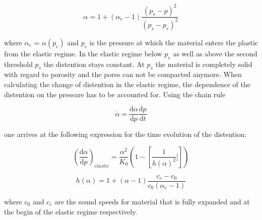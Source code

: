 \begin{equation}
    \alpha = 1 + \left(\alpha_e - 1 \right) \frac{\left(p_s - p\right)^2}{\left(p_s - p_e\right)^2}
\end{equation}

where $\alpha_e$ = $\alpha\left(p_e\right)$ and $p_e$ is the pressure at which the material enters the plastic from the elastic regime. In the elastic regime below $p_e$ as well as above the second threshold $p_s$ the distention stays constant. At $p_s$ the material is completely solid with regard to porosity and the pores can not be compacted anymore. When calculating the change of distention in the elastic regime, the dependence of the distention on the pressure has to be accounted for. Using the chain rule

\begin{equation}
    \dot{\alpha} = \frac{\mathrm{d}\alpha}{\mathrm{d}p}\frac{\mathrm{d}p}{\mathrm{d}t}
\end{equation}

one arrives at the following expression for the time evolution of the distention:

\begin{equation}
    \left(\frac{\mathrm{d}\alpha}{\mathrm{d}p}\right)_{elastic} = \frac{\alpha^2}{K_0}\left(1 - \left[ \frac{1}{h(\alpha)^2}[\right]\right)
\end{equation}

\begin{equation}
    h(\alpha) = 1 + (\alpha - 1)\frac{c_e - c_0}{c_0(\alpha_e - 1)}
\end{equation}

where $c_0$ and $c_e$ are the sound speeds for material that is fully expanded and at the begin of the elastic regime respectively.

